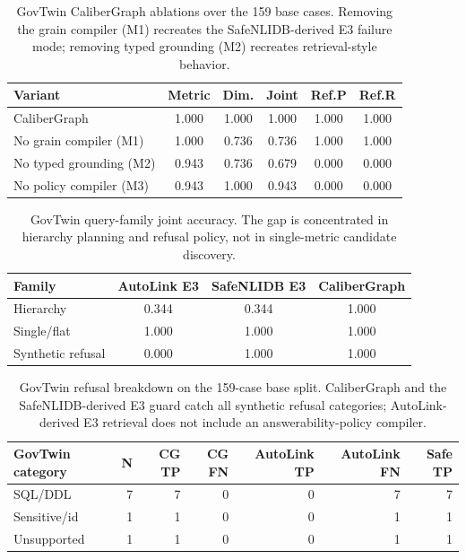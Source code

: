 \documentclass[letterpaper]{article}
\begin{document}
\begin{table}[h]
\centering
\scriptsize
\begin{tabular}{lccccc}
\toprule
Variant & Metric & Dim. & Joint & Ref.P & Ref.R \\
\midrule
CaliberGraph & 1.000 & 1.000 & 1.000 & 1.000 & 1.000 \\
No grain compiler (M1) & 1.000 & 0.736 & 0.736 & 1.000 & 1.000 \\
No typed grounding (M2) & 0.943 & 0.736 & 0.679 & 0.000 & 0.000 \\
No policy compiler (M3) & 0.943 & 1.000 & 0.943 & 0.000 & 0.000 \\
\bottomrule
\end{tabular}
\caption{GovTwin CaliberGraph ablations over the 159 base cases. Removing the grain compiler (M1) recreates the SafeNLIDB-derived E3 failure mode; removing typed grounding (M2) recreates retrieval-style behavior.}
\end{table}

\begin{table}[h]
\centering
\scriptsize
\setlength{\tabcolsep}{1.5pt}
\begin{tabular}{lccc}
\toprule
Family & AutoLink E3 & SafeNLIDB E3 & CaliberGraph \\
\midrule
Hierarchy & 0.344 & 0.344 & 1.000 \\
Single/flat & 1.000 & 1.000 & 1.000 \\
Synthetic refusal & 0.000 & 1.000 & 1.000 \\
\bottomrule
\end{tabular}
\caption{GovTwin query-family joint accuracy. The gap is concentrated in hierarchy planning and refusal policy, not in single-metric candidate discovery.}
\end{table}

\begin{table}[h]
\centering
\scriptsize
\setlength{\tabcolsep}{2pt}
\begin{tabular}{lrrrrrr}
\toprule
GovTwin category & N & CG TP & CG FN & AutoLink TP & AutoLink FN & Safe TP \\
\midrule
SQL/DDL & 7 & 7 & 0 & 0 & 7 & 7 \\
Sensitive/id & 1 & 1 & 0 & 0 & 1 & 1 \\
Unsupported & 1 & 1 & 0 & 0 & 1 & 1 \\
\bottomrule
\end{tabular}
\caption{GovTwin refusal breakdown on the 159-case base split. CaliberGraph and the SafeNLIDB-derived E3 guard catch all synthetic refusal categories; AutoLink-derived E3 retrieval does not include an answerability-policy compiler.}
\end{table}
\end{document}

